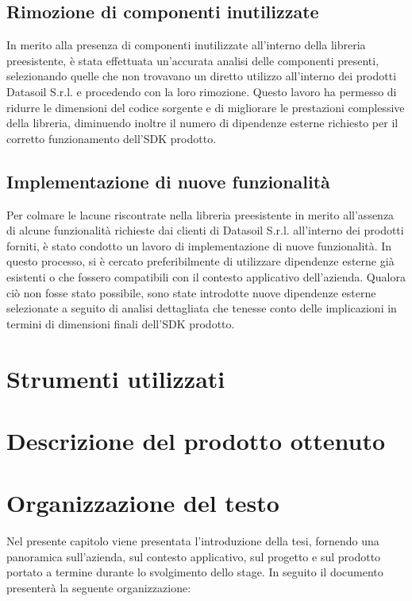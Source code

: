 \subsection{Rimozione di componenti inutilizzate}
In merito alla presenza di componenti inutilizzate all'interno della libreria preesistente, è stata effettuata un'accurata analisi delle componenti presenti, selezionando
quelle che non trovavano un diretto utilizzo all'interno dei prodotti Datasoil S.r.l. e procedendo con la loro rimozione. \newline
Questo lavoro ha permesso di ridurre le dimensioni del codice sorgente e di migliorare le prestazioni complessive della libreria, diminuendo inoltre il numero di dipendenze
esterne richiesto per il corretto funzionamento dell'SDK prodotto. 

\subsection{Implementazione di nuove funzionalità}
Per colmare le lacune riscontrate nella libreria preesistente in merito all'assenza di alcune funzionalità richieste dai clienti di Datasoil S.r.l. all'interno dei prodotti forniti,
è stato condotto un lavoro di implementazione di nuove funzionalità. \newline
In questo processo, si è cercato preferibilmente di utilizzare dipendenze esterne già esistenti o che fossero compatibili con il contesto applicativo dell'azienda. Qualora ciò non 
fosse stato possibile, sono state introdotte nuove dipendenze esterne selezionate a seguito di analisi dettagliata che tenesse conto delle implicazioni in termini di dimensioni 
finali dell'SDK prodotto.


\section{Strumenti utilizzati}

\section{Descrizione del prodotto ottenuto}

\section{Organizzazione del testo}
Nel presente capitolo viene presentata l'introduzione della tesi, fornendo una panoramica sull'azienda, sul contesto applicativo, 
sul progetto e sul prodotto portato a termine durante lo svolgimento dello stage. \newline
In seguito il documento presenterà la seguente organizzazione:

